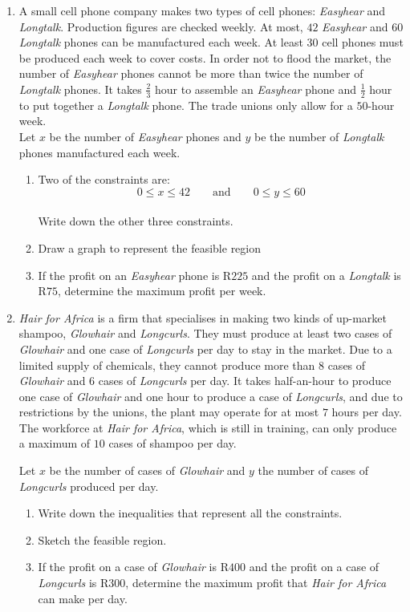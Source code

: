 \begin{eocexercises}{}
\begin{enumerate}
\item{A small cell phone company makes two types of cell phones: \textit{Easyhear} and \textit{Longtalk}. Production figures are checked weekly. At most, $42$ \textit{Easyhear} and $60$ \textit{Longtalk} phones can be manufactured each week. At least $30$ cell phones must be produced each week to cover costs. In order not to flood the market, the number of \textit{Easyhear} phones cannot be more than twice the number of \textit{Longtalk} phones. It takes $\tfrac{2}{3}$ hour to assemble an \textit{Easyhear} phone and $\tfrac{1}{2}$ hour to put together a \textit{Longtalk} phone. The trade unions only allow for a $50$-hour week.\\ Let $x$ be the number of \textit{Easyhear} phones and $y$ be the number of \textit{Longtalk} phones manufactured each week.
\begin{enumerate}
\item{Two of the constraints are: $$0 \leq x \leq 42 \qquad \mathrm{and} \qquad 0 \leq y \leq 60$$\\ Write down the other three constraints.}
\item{Draw a graph to represent the feasible region}
\item{If the profit on an \textit{Easyhear} phone is R$225$ and the profit on a \textit{Longtalk} is R$75$, determine the maximum profit per week.}
\end{enumerate}}

\item{\textit{Hair for Africa} is a firm that specialises in making two kinds of up-market shampoo, \textit{Glowhair} and \textit{Longcurls}. They must produce at least two cases of \textit{Glowhair} and one case of \textit{Longcurls} per day to stay in the market. Due to a limited supply of chemicals, they cannot produce more than $8$ cases of \textit{Glowhair} and $6$ cases of \textit{Longcurls} per day. It takes half-an-hour to produce one case of \textit{Glowhair} and one hour to produce a case of \textit{Longcurls}, and due to restrictions by the unions, the plant may operate for at most $7$ hours per day. The workforce at \textit{Hair for Africa}, which is still in training, can only produce a maximum of $10$ cases of shampoo per day.

Let $x$ be the number of cases of \textit{Glowhair} and $y$ the number of cases of \textit{Longcurls} produced per day.
\begin{enumerate}
\item{Write down the inequalities that represent all the constraints.}
\item{Sketch the feasible region.}
\item{If the profit on a case of \textit{Glowhair} is R$400$ and the profit on a case of \textit{Longcurls} is R$300$, determine the maximum profit that \textit{Hair for Africa} can make per day.}
\end{enumerate}}


\end{enumerate}
\end{eocexercises}
